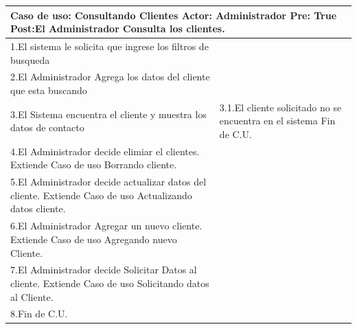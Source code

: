 \begin{longtable}{| p{} | p{} |} 
    \hline
    \multicolumn{2}{|p{16cm}|}{
        \textbf{Caso de uso:} Consultando Clientes \newline
        \textbf{Actor:} Administrador\newline
        \textbf{Pre:}  True\newline
        \textbf{Post:}El Administrador Consulta los clientes.
    }\\
    \hline
    1.El sistema le solicita que ingrese los filtros de busqueda  & \\
    \hline
    2.El Administrador Agrega los datos del cliente que esta buscando& \\
    \hline
    3.El Sistema encuentra el cliente y muestra los datos de contacto & 3.1.El cliente solicitado no se encuentra en el sistema \newline 3.2 Fin de C.U.  \\
    \hline
    4.El Administrador decide elimiar el clientes. Extiende Caso de uso Borrando cliente.& \\
    \hline
    5.El Administrador decide actualizar datos del cliente. Extiende Caso de uso Actualizando datos cliente.& \\
    \hline
    6.El Administrador Agregar un nuevo cliente. Extiende Caso de uso Agregando nuevo Cliente.& \\
    \hline
    7.El Administrador decide Solicitar Datos al cliente. Extiende Caso de uso Solicitando datos al Cliente.& \\
    \hline
    8.Fin de C.U.& \\
    \hline
\end{longtable}

